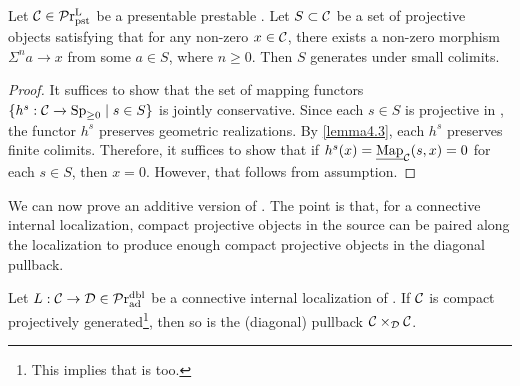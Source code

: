 \documentclass[a4paper,10pt, oneside]{amsart}
\begin{document}
	\begin{lem}\label{pgenpst}
		Let $\mathcal{C}\in\mathcal{P}\mathrm{r}^\mathrm{L}_{\mathrm{pst}}$ be a presentable prestable \infcat. Let $S\subset\mathcal{C}$ be a set of  projective objects satisfying that for any non-zero $x\in\mathcal{C}$, there exists a non-zero morphism $\Sigma^n a\to x$ from some $a\in S$, where $n\geq0$. Then $S$ generates \mcc under small colimits. 
	\end{lem}
	\begin{proof}
	It suffices to show that the set of mapping functors $\{h^s: \mathcal{C}\xrightarrow{} \operatorname{Sp}_{\geq0}\mid s\in S\}$ is jointly 
	conservative. Since each $s\in S$ is projective in \mcc, the functor $h^s$ preserves geometric realizations. 
	By \cref{lemma4.3}, each $h^s$ preserves finite colimits. Therefore, it suffices to show that if 
	$h^s(x)=\underline{\operatorname{Map}}_{\mathcal{C}}(s,x)=0$ for each $s\in S$, then $x=0$. However, that follows from assumption.
	\end{proof}
	We can now prove an additive version of \cite[Proposition 1.88]{efimov2024k}. The point is that, for a connective internal localization, compact projective objects in the source can be paired along the localization to produce enough compact projective objects in the diagonal pullback.
	\begin{prop}\label{diagpullbackcpgen}
		Let $L:\mathcal{C}\to\mathcal{D}\in\mathcal{P}\mathrm{r}_{\mathrm{ad}}^{\mathrm{dbl}}$ be a connective internal localization of \dualaddinfcats. If $\mathcal{C}$ is compact projectively generated\footnote{This implies that \mcd is too.}, then so is the (diagonal) pullback $\mathcal{C}\times_{\mathcal{D}}\mathcal{C}$.
	\end{prop}
\end{document}
